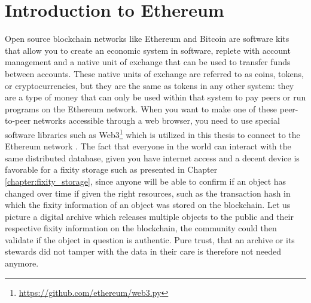 \section{Introduction to Ethereum}
\label{sec:eth-blockchain}
Open source blockchain networks like Ethereum and Bitcoin are software kits that allow you to create an economic system in software, replete with account management and a native unit of exchange that can be used to transfer funds between accounts. These native units of exchange are referred to as coins, tokens, or cryptocurrencies, but they are the same as tokens in any other system: they are a type of money that can only be used within that system to pay peers or run programs on the Ethereum network.
When you want to make one of these peer-to-peer networks accessible through a web browser, you need to use special software libraries such as Web3\footnote{\url{https://github.com/ethereum/web3.py}} which is utilized in this thesis to connect to the Ethereum network \cite[2]{dannen2017introducing}.
The fact that everyone in the world can interact with the same distributed database, given you have internet access and a decent device is favorable for a fixity storage such as presented in Chapter \ref{chapter:fixity_storage}, since anyone will be able to confirm if an object has changed over time if given the right resources, such as the transaction hash in which the fixity information of an object was stored on the blockchain. Let us picture a digital archive which releases multiple objects to the public and their respective fixity information on the blockchain, the community could then validate if the object in question is authentic. Pure trust, that an archive or its stewards did not tamper with the data in their care is therefore not needed anymore.
